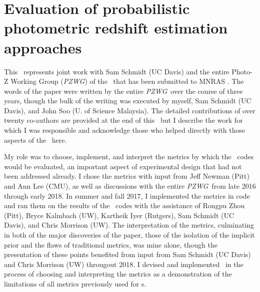 \renewcommand{\chapid}{pzdc1}



\newcommand{\kids}{\project{KiDS}}
\newcommand{\hsc}{\project{HSC}}
\newcommand{\wfirst}{\project{WFIRST}}
\newcommand{\buzz}{\project{Buzzard}}
\newcommand{\pzwg}{\textit{PZWG}}
\newcommand{\proj}[1]{\textsc{#1}}
\newcommand{\lsstdesc}{\lsst-\proj{DESC}}
\newcommand{\chisq}{$\chi^{2}$}
\newcommand{\boldblue}[1]{{\bf \textcolor{blue}{#1}}}

\newcommand{\annz}{\pzcode{ANNz2}}
\newcommand{\bpz}{\pzcode{BPz}}
\newcommand{\cmnn}{\pzcode{CMNN}}
\newcommand{\delight}{\pzcode{Delight}}
\newcommand{\eazy}{\pzcode{EAZY}}
\newcommand{\flexzboost}{\pzcode{FlexZBoost}}
\newcommand{\gpz}{\pzcode{GPz}}
\newcommand{\lephare}{\pzcode{LePhare}}
\newcommand{\metaphor}{\pzcode{METAPhoR}}
\newcommand{\skynet}{\pzcode{SkyNet}}
\newcommand{\tpz}{\pzcode{TPZ}}
\def\X{{\mathbf{X}}}
\def\x{{\mathbf{x}}}
\def\E{{\mathbb{E}}}

\chapter{ Evaluation of probabilistic photometric redshift estimation approaches  }

This \paper\ represents joint work with Sam Schmidt (UC Davis) and the entire Photo-Z Working Group (\pzwg) of the \desc\ that has been submitted to MNRAS \citep{schmidt_evaluation_2020}. 
The words of the paper were written by the entire \pzwg\ over the course of three years, though the bulk of the writing was executed by myself, Sam Schmidt (UC Davis), and John Soo (U. of Science Malaysia).
The detailed contributions of over twenty co-authors are provided at the end of this \paper\ but I describe the work for which I was responsible and acknowledge those who helped directly with those aspects of the \paper\ here.

My role was to choose, implement, and interpret the metrics by which the \pzpdf\ codes would be evaluated, an important aspect of experimental design that had not been addressed already.
I chose the metrics with input from Jeff Newman (Pitt) and Ann Lee (CMU), as well as discussions with the entire \pzwg\ from late 2016 through early 2018.
In summer and fall 2017, I implemented the metrics in code and ran them on the results of the \pzpdf\ codes with the assistance of Rongpu Zhou (Pitt), Bryce Kalmbach (UW), Kartheik Iyer (Rutgers), Sam Schmidt (UC Davis), and Chris Morrison (UW).
The interpretation of the metrics, culminating in both of the major discoveries of the paper, those of the isolation of the implicit prior and the flaws of traditional metrics, was mine alone, though the presentation of these points benefited from input from Sam Schmidt (UC Davis) and Chris Morrison (UW) througout 2018.
I devised and implemented \trainz\ in the process of choosing and interpreting the metrics as a demonstration of the limitations of all metrics previously used for \pzpdf s.

